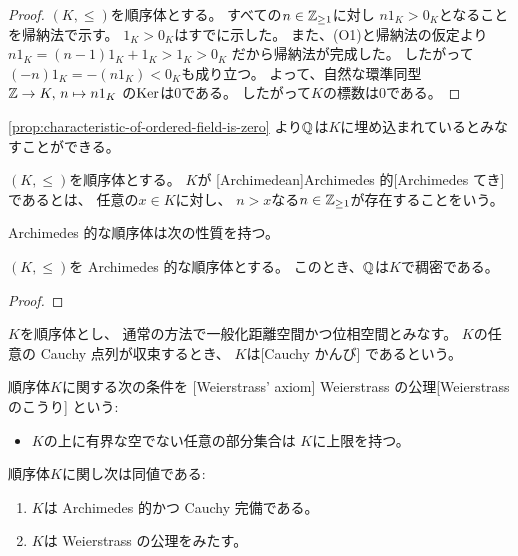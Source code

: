 \documentclass[report]{jlreq}
\begin{document}
\begin{proof}
    $(K, \le)$を順序体とする。
    すべての$n \in \mathbb{Z}_{\ge 1}$に対し
    $n 1_K > 0_K$となることを帰納法で示す。
    $1_K > 0_K$はすでに示した。
    また、(O1)と帰納法の仮定より
    $n 1_K = (n - 1)1_K + 1_K > 1_K > 0_K$
    だから帰納法が完成した。
    したがって$(-n) 1_K = - (n 1_K) < 0_K$も成り立つ。
    よって、自然な環準同型$\mathbb{Z} \to K, \, n \mapsto n 1_K$
    の$\operatorname{\mathrm{Ker}}$は$0$である。
    したがって$K$の標数は$0$である。
\end{proof}

\cref{prop:characteristic-of-ordered-field-is-zero}
より$\mathbb{Q}$は$K$に埋め込まれているとみなすことができる。

\begin{definition}[Archimedes 的]
    $(K, \le)$を順序体とする。
    $K$が
    [Archimedean]{Archimedes 的}[Archimedes てき]
    であるとは、
    任意の$x \in K$に対し、
    $n > x$なる$n \in \mathbb{Z}_{\ge 1}$が存在することをいう。
\end{definition}

Archimedes 的な順序体は次の性質を持つ。

\begin{proposition}
    $(K, \le)$を Archimedes 的な順序体とする。
    このとき、$\mathbb{Q}$は$K$で稠密である。
\end{proposition}

\begin{proof}
    \TODO{}
\end{proof}

\begin{definition}[Cauchy 完備]
    $K$を順序体とし、
    通常の方法で一般化距離空間かつ位相空間とみなす。
    $K$の任意の Cauchy 点列が収束するとき、
    $K$は[Cauchy かんび]
    であるという。
\end{definition}

\begin{definition}
    順序体$K$に関する次の条件を
    [Weierstrass' axiom]
        {Weierstrass の公理}[Weierstrass のこうり]
    という:
    \begin{itemize}
        \item $K$の上に有界な空でない任意の部分集合は
            $K$に上限を持つ。
    \end{itemize}
\end{definition}

\begin{proposition}
    順序体$K$に関し次は同値である:
    \begin{enumerate}
        \item $K$は Archimedes 的かつ Cauchy 完備である。
        \item $K$は Weierstrass の公理をみたす。
    \end{enumerate}
\end{proposition}
\end{document}

